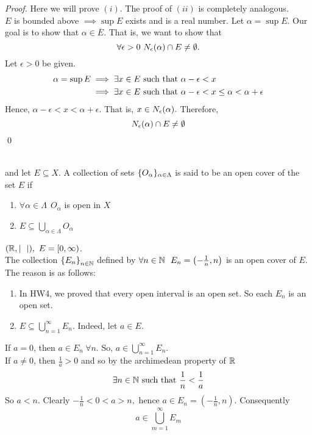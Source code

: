 \begin{proof}
    Here we will prove $(i)$. The proof of $(ii)$ is completely analogous. \\
    $E$ is bounded above $\implies \sup E$ exists and is a real number. Let $\alpha = \sup E$. Our goal is to show that $\alpha \in \overline{E}$. That is, we want to show that 
    $$\forall \epsilon > 0 ~N_{\epsilon}(\alpha) \cap E \not = \emptyset.$$
    Let $\epsilon > 0$ be given.
    \begin{align*}
        \alpha = \sup E &\implies \exists x \in E \text{ such that } \alpha - \epsilon < x \\
        &\implies \exists x \in E \text{ such that } \alpha - \epsilon < x \leq \alpha < \alpha + \epsilon
    \end{align*}
    Hence, $\alpha - \epsilon < x < \alpha + \epsilon.$ That is, $x \in N_{\epsilon}(\alpha).$ Therefore,
    $$N_{\epsilon}(\alpha) \cap E \not = \emptyset$$
    \qed
\end{proof}

\begin{definition}  \leavevmode \\
    \routineMS and let $E\subseteq X.$ A collection of sets $\{O_\alpha \}_{\alpha \in \Lambda}$ is said to be an open cover of the set $E$ if 
    \begin{enumerate}[$(i)$]
        \item $\forall \alpha \in \Lambda ~~O_{\alpha}$ is open in $X$
        \item $E\subseteq \bigcup \limits_{\alpha \in \Lambda} O_{\alpha}$
    \end{enumerate}
\end{definition}

\begin{example}
    $(\mathbb{R}, |~~|), ~E = [0, \infty)$. \leavevmode \\
    The collection $\left\{E_n\right\}_{n\in \mathbb{N}}$ defined by $\forall n \in \mathbb{N} ~~E_n = \left(-\frac{1}{n}, n\right)$ is an open cover of $E$. The reason is as follows:
    \begin{enumerate} [$(i)$]
        \item In HW4, we proved that every open interval is an open set. So each $E_n$ is an open set.
        \item $E\subseteq \bigcup \limits_{n=1}^\infty E_n.$ Indeed, let $a\in E.$
    \end{enumerate}
    If $a = 0$, then $a \in E_n ~\forall n$. So, $a \in \bigcup \limits_{n=1}^\infty E_n.$ \\
    If $a \not = 0$, then $\frac{1}{a} > 0$ and so by the archimedean property of $\mathbb{R}$
    $$\exists n \in \mathbb{N} \text{ such that } \frac{1}{n} < \frac{1}{a}$$
    So $a < n.$ Clearly $-\frac{1}{n} < 0 < a > n,$ hence $a \in E_n = \left(-\frac{1}{n}, n\right).$ Consequently
    $$a \in \bigcup \limits_{m=1}^\infty E_m$$
\end{example}